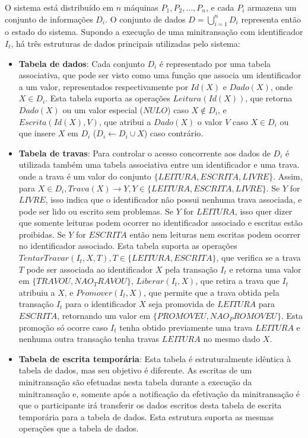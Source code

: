 \documentclass[11pt,twoside,a4paper]{book}
\begin{document}
O sistema está distribuído em $n$ máquinas $P_1, P_2, \dotsc, P_n$, e cada $P_i$ armazena um conjunto de informações $D_i$. O conjunto de dados $D = \bigcup_{i=1}^n D_i$ representa então o estado do sistema. Supondo a execução de uma minitransação com identificador \(I_t\), há três estruturas de dados principais utilizadas pelo sistema:
\begin{itemize}

\item \textbf{Tabela de dados}: Cada conjunto \(D_i\) é representado por uma tabela associativa, que pode ser visto como uma função que associa um identificador a um valor, representados respectivamente por \(Id(X)\) e \(Dado(X)\), onde \(X \in D_i\). Esta tabela suporta as operações \(Leitura(Id(X))\), que retorna \(Dado(X)\) ou um valor especial (\(NULO\)) caso \(X \notin D_i\), e \(Escrita(Id(X), V)\), que atribui a \(Dado(X)\) o valor \(V\) caso $X \in D_i$ ou  que insere $X$ em $D_i$ ($D_i \gets D_i \cup X$) caso contrário. 

\item \textbf{Tabela de travas}: Para controlar o acesso concorrente aos dados de \(D_i\) é utilizada também uma tabela associativa entre um identificador e uma trava. onde a trava é um valor do conjunto \(\{LEITURA, ESCRITA, LIVRE\}\). Assim, para \(X \in D_i, Trava(X) \rightarrow Y, Y \in \{LEITURA, ESCRITA, LIVRE\}\). Se \(Y\) for \(LIVRE\), isso indica que o identificador não possui nenhuma trava associada, e pode ser lido ou escrito sem problemas. Se \(Y\) for \(LEITURA\), isso quer dizer que somente leituras podem ocorrer no identificador associado e escritas estão proibidas. Se \(Y\) for \(ESCRITA\) então nem leituras nem escritas podem ocorrer no identificador associado. Esta tabela suporta as operações \(TentarTravar(I_t, X, T), T \in \{LEITURA, ESCRITA\}\), que verifica se a trava \(T\) pode ser associada ao identificador \(X\) pela transação \(I_t\) e retorna uma valor em $\{TRAVOU, NAO_TRAVOU\}$, \(Liberar(I_t, X)\), que retira a trava que \(I_t\) atribuiu a \(X\), e $Promover(I_t, X)$, que permite que a trava obtida pela transação $I_t$ para o identificador $X$ seja promovida de $LEITURA$ para $ESCRITA$, retornando um valor em $\{PROMOVEU, NAO_PROMOVEU\}$. Esta promoção só ocorre caso $I_t$ tenha obtido previamente uma trava $LEITURA$ e nenhuma outra transação tenha travas $LEITURA$ no mesmo dado $X$.

\item \textbf{Tabela de escrita temporária}: Esta tabela é estruturalmente idêntica à tabela de dados, mas seu objetivo é diferente. As escritas de um minitransação são efetuadas nesta tabela durante a execução da minitransação e, somente após a notificação da efetivação da minitransação é que o participante irá transferir os dados escritos desta tabela de escrita temporária para a tabela de dados. Esta estrutura suporta as mesmas operações que a tabela de dados.
\end{itemize}
\end{document}
